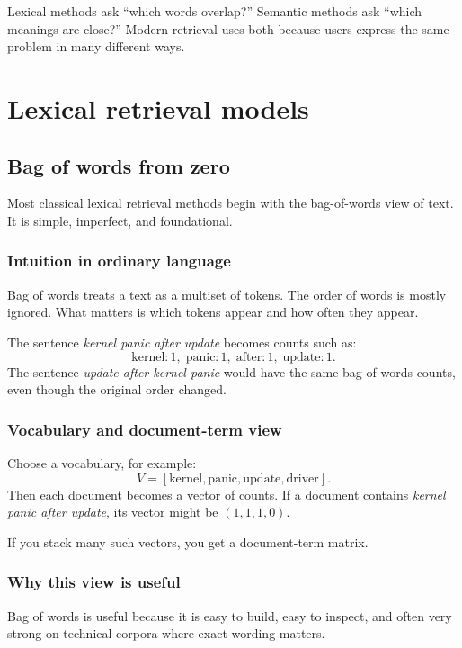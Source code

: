 \documentclass[11pt,oneside]{report}
\begin{document}
\begin{rememberbox}
Lexical methods ask ``which words overlap?'' Semantic methods ask ``which meanings are close?'' Modern retrieval uses both because users express the same problem in many different ways.
\end{rememberbox}


\part[Lexical Models]{Lexical retrieval models}
\chapter[Bag of Words]{Bag of words from zero}

\begin{purposebox}
Most classical lexical retrieval methods begin with the bag-of-words view of text. It is simple, imperfect, and foundational.
\end{purposebox}

\section*{Intuition in ordinary language}
Bag of words treats a text as a multiset of tokens. The order of words is mostly ignored. What matters is which tokens appear and how often they appear.

\begin{examplebox}
The sentence \emph{kernel panic after update} becomes counts such as:
\[
\text{kernel}:1,\; \text{panic}:1,\; \text{after}:1,\; \text{update}:1.
\]
The sentence \emph{update after kernel panic} would have the same bag-of-words counts, even though the original order changed.
\end{examplebox}

\section*{Vocabulary and document-term view}
Choose a vocabulary, for example:
\[
V=[\text{kernel},\text{panic},\text{update},\text{driver}].
\]
Then each document becomes a vector of counts. If a document contains \emph{kernel panic after update}, its vector might be $(1,1,1,0)$.

If you stack many such vectors, you get a document-term matrix.

\section*{Why this view is useful}
Bag of words is useful because it is easy to build, easy to inspect, and often very strong on technical corpora where exact wording matters.
\end{document}
